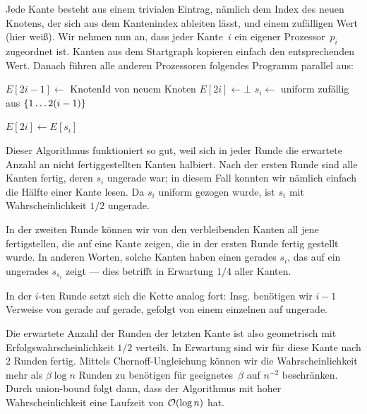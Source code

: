 \begin{center}
\end{center}

Jede Kante besteht aus einem trivialen  Eintrag, nämlich dem Index des neuen Knotens, der sich aus dem Kantenindex ableiten lässt, und einem zufälligen Wert (hier weiß).
Wir nehmen nun an, dass jeder Kante~$i$ ein eigener Prozessor~$p_i$ zugeordnet ist.
Kanten aus dem Startgraph kopieren einfach den entsprechenden Wert.
Danach führen alle anderen Prozessoren folgendes Programm parallel aus:

\begin{algorithm}[H]
    $E[2i - 1] \gets$ KnotenId von neuem Knoten\;
    $E[2i] \gets \bot$\;
    \BlankLine
    $s_i \gets $ uniform zufällig aus $\left\{1 \ldots 2(i-1)\right\}$\;

    $E[2i] \gets E[s_i]$\;
\end{algorithm}

Dieser Algorithmus funktioniert so gut, weil sich in jeder Runde die erwartete Anzahl an nicht fertiggestellten Kanten halbiert.
Nach der ersten Runde sind alle Kanten fertig, deren $s_i$ ungerade war;
in diesem Fall konnten wir nämlich einfach die  Hälfte einer Kante lesen.
Da $s_i$ uniform gezogen wurde, ist $s_i$ mit Wahrscheinlichkeit $1/2$ ungerade.

In der zweiten Runde können wir von den verbleibenden Kanten all jene fertigstellen, die auf eine Kante zeigen, die in der ersten Runde fertig gestellt wurde.
In anderen Worten, solche Kanten haben einen gerades $s_i$, das auf ein ungerades $s_{s_i}$ zeigt --- dies betrifft in Erwartung $1/4$ aller Kanten.

In der $i$-ten Runde setzt sich die Kette analog fort:
Insg. benötigen wir $i-1$ Verweise von gerade auf gerade, gefolgt von einem einzelnen auf ungerade.

Die erwartete Anzahl der Runden der letzten Kante ist also geometrisch mit Erfolgswahrscheinlichkeit $1/2$ verteilt.
In Erwartung sind wir für diese Kante nach $2$ Runden fertig.
Mittels Chernoff-Ungleichung können wir die Wahrscheinlichkeit mehr als $\beta \log n$ Runden zu benötigen für geeignetes~$\beta$ auf $n^{-2}$ beschränken.
Durch union-bound folgt dann, dass der Algorithmus mit hoher Wahrscheinlichkeit eine Laufzeit von $\mathcal{O}\!\left(\log n\right)$ hat.

